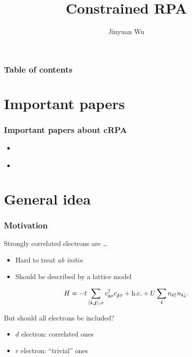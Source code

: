\documentclass{beamer}
\title{Constrained RPA}
\author{Jinyuan Wu}
\newcommand{\pair}[1]{\langle #1 \rangle}
\newcommand*{\abinitio}{\textit{ab initio}}
\begin{document}
\frame{\titlepage}

\begin{frame}
\frametitle{Table of contents}

\tableofcontents    

\end{frame}

\section{Important papers}

\begin{frame}
\frametitle{Important papers about cRPA}

\begin{itemize}
    \item \cite{aryasetiawan2004frequency}
    \item \cite{aryasetiawan2011constrained}
\end{itemize}

\end{frame}

\section{General idea}

\begin{frame}
\frametitle{Motivation}

Strongly correlated electrons are \dots
\begin{itemize}
    \item Hard to treat \abinitio
    \item Should be described by a lattice model
\end{itemize}    

\begin{equation}
    H = - t \sum_{\pair{\vb*{i}, \vb*{j}}, \sigma}
        c^\dagger_{\vb*{i} \sigma} c_{\vb*{j} \sigma}
        + \text{h.c.}
        + U \sum_{\vb*{i}} n_{\vb*{i} \uparrow} n_{\vb*{i} \downarrow}.
\end{equation}

But should all electrons be included?

\begin{itemize}
    \item $d$ electron: correlated ones 
    \item $r$ electron: ``trivial'' ones
\end{itemize}

\end{frame}
\end{document}
